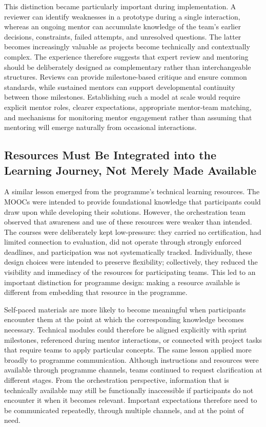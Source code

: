 \documentclass[runningheads]{llncs}
\begin{document}
This distinction became particularly important during implementation. A reviewer can identify weaknesses in a prototype during a single interaction, whereas an ongoing mentor can accumulate knowledge of the team’s earlier decisions, constraints, failed attempts, and unresolved questions. The latter becomes increasingly valuable as projects become technically and contextually complex. The experience therefore suggests that expert review and mentoring should be deliberately designed as complementary rather than interchangeable structures. Reviews can provide milestone-based critique and ensure common standards, while sustained mentors can support developmental continuity between those milestones. Establishing such a model at scale would require explicit mentor roles, clearer expectations, appropriate mentor-team matching, and mechanisms for monitoring mentor engagement rather than assuming that mentoring will emerge naturally from occasional interactions.

\subsection{Resources Must Be Integrated into the Learning Journey, Not Merely Made Available}

A similar lesson emerged from the programme’s technical learning resources. The MOOCs were intended to provide foundational knowledge that participants could draw upon while developing their solutions. However, the orchestration team observed that awareness and use of these resources were weaker than intended. The courses were deliberately kept low-pressure: they carried no certification, had limited connection to evaluation, did not operate through strongly enforced deadlines, and participation was not systematically tracked. Individually, these design choices were intended to preserve flexibility; collectively, they reduced the visibility and immediacy of the resources for participating teams. This led to an important distinction for programme design: making a resource available is different from embedding that resource in the programme.

Self-paced materials are more likely to become meaningful when participants encounter them at the point at which the corresponding knowledge becomes necessary. Technical modules could therefore be aligned explicitly with sprint milestones, referenced during mentor interactions, or connected with project tasks that require teams to apply particular concepts. The same lesson applied more broadly to programme communication. Although instructions and resources were available through programme channels, teams continued to request clarification at different stages. From the orchestration perspective, information that is technically available may still be functionally inaccessible if participants do not encounter it when it becomes relevant. Important expectations therefore need to be communicated repeatedly, through multiple channels, and at the point of need.
\end{document}
